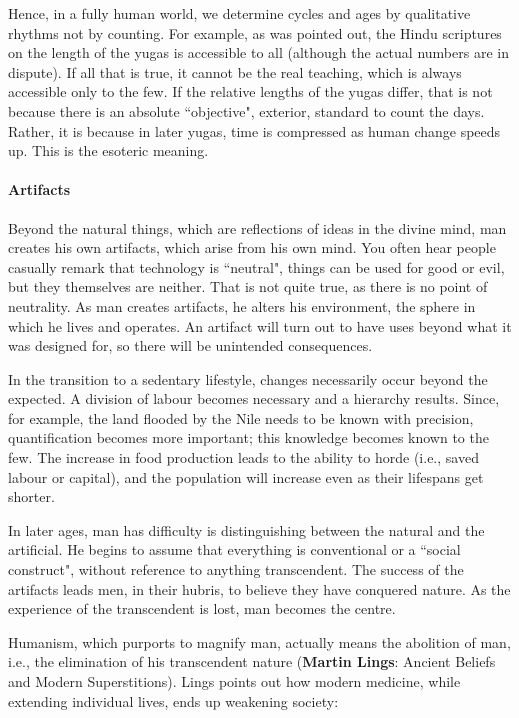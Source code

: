 Hence, in a fully human world, we determine cycles and ages by qualitative rhythms not by counting. For example, as was pointed out, the Hindu scriptures on the length of the yugas is accessible to all (although the actual numbers are in dispute). If all that is true, it cannot be the real teaching, which is always accessible only to the few. If the relative lengths of the yugas differ, that is not because there is an absolute ``objective", exterior, standard to count the days. Rather, it is because in later yugas, time is compressed as human change speeds up. This is the esoteric meaning.

\paragraph{Artifacts}
Beyond the natural things, which are reflections of ideas in the divine mind, man creates his own artifacts, which arise from his own mind. You often hear people casually remark that technology is ``neutral", things can be used for good or evil, but they themselves are neither. That is not quite true, as there is no point of neutrality. As man creates artifacts, he alters his environment, the sphere in which he lives and operates. An artifact will turn out to have uses beyond what it was designed for, so there will be unintended consequences.

In the transition to a sedentary lifestyle, changes necessarily occur beyond the expected. A division of labour becomes necessary and a hierarchy results. Since, for example, the land flooded by the Nile needs to be known with precision, quantification becomes more important; this knowledge becomes known to the few. The increase in food production leads to the ability to horde (i.e., saved labour or capital), and the population will increase even as their lifespans get shorter.

In later ages, man has difficulty is distinguishing between the natural and the artificial. He begins to assume that everything is conventional or a ``social construct", without reference to anything transcendent. The success of the artifacts leads men, in their hubris, to believe they have conquered nature. As the experience of the transcendent is lost, man becomes the centre.

Humanism, which purports to magnify man, actually means the abolition of man, i.e., the elimination of his transcendent nature (\textbf{Martin Lings}: Ancient Beliefs and Modern Superstitions). Lings points out how modern medicine, while extending individual lives, ends up weakening society:

